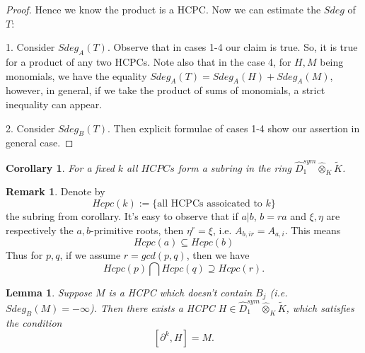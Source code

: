 \documentclass[11pt]{article}
\theoremstyle{definition}
\newtheorem{rem}{Remark}[section]
\theoremstyle{plain}
\newtheorem{lemma}{Lemma}[section]
\newtheorem{cor}{Corollary}[section]
\numberwithin{equation}{section}
\begin{document}
\begin{proof}
    Hence we know the product is a HCPC. Now we can estimate the $Sdeg$ of $T$:
    
    	1. Consider $Sdeg_A(T)$. Observe that in cases 1-4 our claim is true. So, it is true for a product of any two HCPCs. Note also that in the case 4, for $H,M$ being monomials, we have the equality $Sdeg_A(T)=Sdeg_A(H)+Sdeg_A(M)$, however, in general, if we take the product of sums of monomials, a strict inequality can appear. 
    	 
    	2. Consider $Sdeg_B(T)$. Then explicit formulae of cases 1-4 show our assertion in general case.  
    
\end{proof}

\begin{cor}
\label{C:HCPC(k)}
	For a fixed $k$ all $HCPCs$  form a subring in the ring $\hat{D}_1^{sym}\hat{\otimes}_K\tilde{K}$.
\end{cor}

\begin{rem}
Denote by
$$
Hcpc(k):=\{\text{all HCPCs assoicated to }k\}
$$
the subring from corollary. 
It's easy to observe that if $a|b$, $b=ra$ and $\xi,\eta$ are respectively  the $a,b$-primitive roots, then $\eta^r=\xi$, i.e. $A_{b,ir}=A_{a,i}$. This means
$$
Hcpc(a)\subseteq Hcpc(b)
$$
Thus for $p,q$, if we assume $r=gcd(p,q)$, then we have 
$$
Hcpc(p)\bigcap Hcpc(q)\supseteq Hcpc(r).
$$
\end{rem}

\begin{lemma}
	\label{L:ODE sol 2}
	Suppose $M$ is a HCPC which doesn't contain $B_j$ (i.e. $Sdeg_B(M)=-\infty$). Then there exists a HCPC $H\in \hat{D}_1^{sym}\hat{\otimes}_K\tilde{K}$, which satisfies the condition
	$$
	[\partial^k,H]=M. 
	$$
	\end{lemma}
\end{document}
